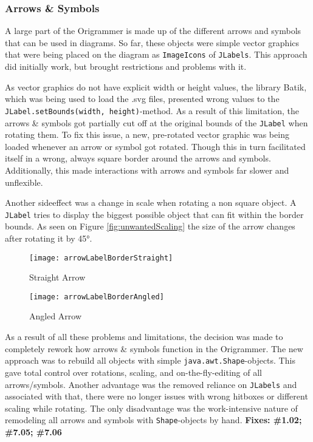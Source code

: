 \subsubsection{Arrows \& Symbols}
A large part of the Origrammer is made up of the different arrows and symbols that can be used in diagrams. So far, these objects were simple vector graphics that were being placed on the diagram as \texttt{ImageIcons} of \texttt{JLabels}. This approach did initially work, but brought restrictions and problems with it.

 As vector graphics do not have explicit width or height values, the library Batik\cite{batik}, which was being used to load the .svg files, presented wrong values to the \texttt{JLabel.setBounds(width, height)}-method. As a result of this limitation, the arrows \& symbols got partially cut off at the original bounds of the \texttt{JLabel} when rotating them. To fix this issue, a new, pre-rotated vector graphic was being loaded whenever an arrow or symbol got rotated. Though this in turn facilitated itself in a wrong, always square border around the arrows and symbols. Additionally, this made interactions with arrows and symbols far slower and unflexible.
 
 Another sideeffect was a change in scale when rotating a non square object. A \texttt{JLabel} tries to display the biggest possible object that can fit within the border bounds. As seen on Figure \ref{fig:unwantedScaling} the size of the arrow changes after rotating it by 45°.

\begin{figure*}[htbp]
	\centering
	\begin{subfigure}{0.3\textwidth}
		\texttt{[image: arrowLabelBorderStraight]}
		\caption{Straight Arrow}
		\label{fig:arrowLabelBorderStraight}
	\end{subfigure}
	\begin{subfigure}{0.3\textwidth}
		\texttt{[image: arrowLabelBorderAngled]}
		\caption{Angled Arrow}
		\label{fig:arrowLabelBorderAngled}
	\end{subfigure}
	\caption{Unwanted Scaling when Rotating and the wrong, always square hitbox}
	\label{fig:unwantedScaling}
\end{figure*}

As a result of all these problems and limitations, the decision was made to completely rework how arrows \& symbols function in the Origrammer. The new approach was to rebuild all objects with simple \texttt{java.awt.Shape}-objects. This gave total control over rotations, scaling, and on-the-fly-editing of all arrows/symbols. Another advantage was the removed reliance on \texttt{JLabels} and associated with that, there were no longer issues with wrong hitboxes or different scaling while rotating. The only disadvantage was the work-intensive nature of remodeling all arrows and symbols with \texttt{Shape}-objects by hand.
\newline
\textbf{Fixes: \#1.02; \#7.05; \#7.06}

